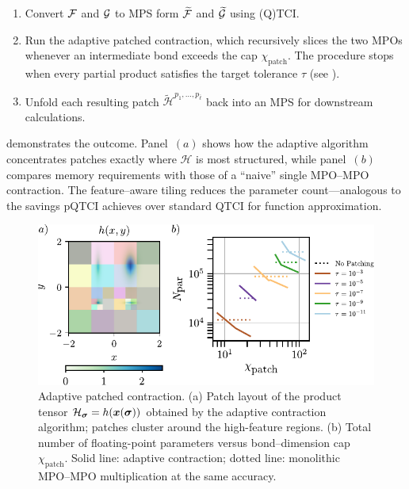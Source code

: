 \begingroup
\renewcommand{\labelenumi}{(\roman{enumi})}
\begin{enumerate}
  \item Convert \(\mathcal{F}\) and \(\mathcal{G}\) to MPS form
        \(\widetilde{\mathcal{F}}\) and \(\widetilde{\mathcal{G}}\) using (Q)TCI.
 \item Run the adaptive patched contraction, which recursively slices the two MPOs whenever an intermediate bond exceeds the cap \(\chi_{\text{patch}}\). The procedure stops when every partial product satisfies the target tolerance $\tau$ (see ).
  \item Unfold each resulting patch
        \(\widetilde{\mathcal H}^{p_{1},\dots,p_{\bar\ell}}\) back into an MPS for downstream calculations.
\end{enumerate} 
\endgroup

 demonstrates the outcome. Panel~$(a)$ shows how the adaptive algorithm concentrates patches exactly
where \(\mathcal H\) is most structured, while panel~$(b)$ compares memory requirements with those of a ``naive'' single MPO–MPO contraction.
The feature–aware tiling reduces the parameter count—analogous to the savings pQTCI achieves over standard QTCI for function approximation.
\begin{figure}[ht!]
    \centering
    \includegraphics{figures/adaptiveMulResults.pdf}
    \caption{Adaptive patched contraction.
    (a) Patch layout of the product tensor \({\mathcal H}_{\boldsymbol{\sigma}} = h(\boldsymbol{x}(\boldsymbol{\sigma}))\) obtained by the adaptive contraction algorithm; patches cluster around the high-feature regions.
    (b) Total number of floating-point parameters versus bond–dimension cap \(\chi_{\text{patch}}\). Solid line: adaptive contraction; dotted line: monolithic MPO–MPO multiplication at the same accuracy.}
    \label{fig:adaptiveMulResults}
\end{figure}




